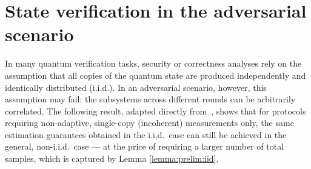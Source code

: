 \documentclass[a4paper,twocolumn,11pt,unpublished]{../../revision/quantumarticle}
\begin{document}
\section{State verification in the adversarial scenario}
\label{section:verification}

In many quantum verification tasks, security or correctness analyses rely on the assumption that all copies of the quantum state are produced independently and identically distributed (i.i.d.).
In an adversarial scenario, however, this assumption may fail: the subsystems across different rounds can be arbitrarily correlated.
The following result, adapted directly from~\cite[Theorem~3]{FKMO24learning}, shows that for protocols requiring non-adaptive, single-copy (incoherent) measurements only, the same estimation guarantees obtained in the i.i.d.\ case can still be achieved in the general, non-i.i.d.\ case — at the price of requiring a larger number of total samples, which is captured by Lemma \ref{lemma:prelim:iid}.
\end{document}
